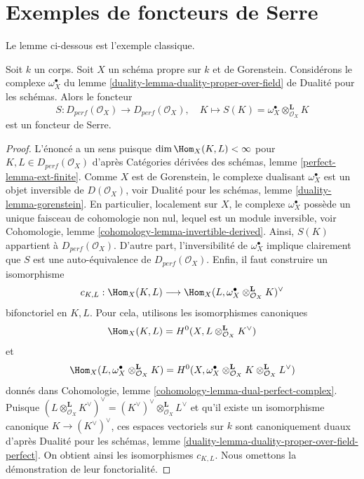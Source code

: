 \section{Exemples de foncteurs de Serre}
\label{section-examples-Serre-functors}

\noindent
Le lemme ci-dessous est l'exemple classique.

\begin{lemma}
\label{lemma-Serre-functor-Gorenstein-proper}
Soit $k$ un corps. Soit $X$ un schéma propre sur $k$ et de Gorenstein.
Considérons le complexe $\omega_X^\bullet$ du
lemme \ref{duality-lemma-duality-proper-over-field} de Dualité pour les schémas.
Alors le foncteur
$$
S : D_{perf}(\mathcal{O}_X) \longrightarrow D_{perf}(\mathcal{O}_X),\quad
K \longmapsto S(K) = \omega_X^\bullet \otimes_{\mathcal{O}_X}^\mathbf{L} K
$$
est un foncteur de Serre.
\end{lemma}

\begin{proof}
L'énoncé a un sens puisque $\dim \Hom_X(K, L) < \infty$
pour $K, L \in D_{perf}(\mathcal{O}_X)$ d'après
Catégories dérivées des schémas, lemme \ref{perfect-lemma-ext-finite}.
Comme $X$ est de Gorenstein, le complexe dualisant $\omega_X^\bullet$
est un objet inversible de $D(\mathcal{O}_X)$, voir
Dualité pour les schémas, lemme \ref{duality-lemma-gorenstein}.
En particulier, localement sur $X$, le complexe $\omega_X^\bullet$
possède un unique faisceau de cohomologie non nul, lequel est un module inversible, voir
Cohomologie, lemme \ref{cohomology-lemma-invertible-derived}.
Ainsi, $S(K)$ appartient à $D_{perf}(\mathcal{O}_X)$.
D'autre part, l'inversibilité de $\omega_X^\bullet$
implique clairement que $S$ est une auto-équivalence de $D_{perf}(\mathcal{O}_X)$.
Enfin, il faut construire un isomorphisme
$$
c_{K, L} : \Hom_X(K, L) \longrightarrow
\Hom_X(L, \omega_X^\bullet \otimes_{\mathcal{O}_X}^\mathbf{L} K)^\vee
$$
bifonctoriel en $K, L$. Pour cela, utilisons les isomorphismes canoniques
$$
\Hom_X(K, L) = H^0(X, L \otimes_{\mathcal{O}_X}^\mathbf{L} K^\vee)
$$
et
$$
\Hom_X(L, \omega_X^\bullet \otimes_{\mathcal{O}_X}^\mathbf{L} K) =
H^0(X, 
\omega_X^\bullet \otimes_{\mathcal{O}_X}^\mathbf{L} K
\otimes_{\mathcal{O}_X}^\mathbf{L} L^\vee)
$$
donnés dans Cohomologie, lemme \ref{cohomology-lemma-dual-perfect-complex}.
Puisque $(L \otimes_{\mathcal{O}_X}^\mathbf{L} K^\vee)^\vee =
(K^\vee)^\vee \otimes_{\mathcal{O}_X}^\mathbf{L} L^\vee$
et qu'il existe un isomorphisme canonique $K \to (K^\vee)^\vee$,
ces espaces vectoriels sur $k$ sont canoniquement duaux d'après
Dualité pour les schémas, lemme
\ref{duality-lemma-duality-proper-over-field-perfect}.
On obtient ainsi les isomorphismes $c_{K, L}$.
Nous omettons la démonstration de leur fonctorialité.
\end{proof}





